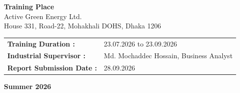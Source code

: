 \begin{titlepage}
\begin{center}
\vspace{0.8cm}

\textbf{Training Place}\\
Active Green Energy Ltd.\\
House 331, Road-22, Mohakhali DOHS, Dhaka 1206

\vspace{0.8cm}

\begin{tabular}{@{}ll}
\hspace{1.8cm}\textbf{Training Duration    :} & 23.07.2026 to 23.09.2026 \\
\hspace{1.8cm}\textbf{Industrial Supervisor      :} & Md. Mochaddec Hossain, Business Analyst \\
\hspace{1.8cm}\textbf{Report Submission Date          :} & 28.09.2026 \\
\end{tabular}

\vspace{0.8cm}

\thispagestyle{empty}
\vspace*{\fill}
\begin{center}
    {\Large \textbf{Summer 2026}}
\end{center}
\vspace*{\fill}

\end{center}
\end{titlepage}
